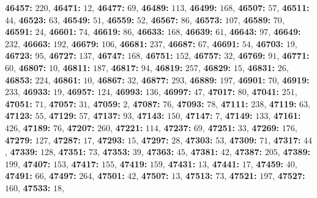 \textsf{\bfseries 46457:} $220$, \textsf{\bfseries 46471:} $12$, \textsf{\bfseries 46477:} $69$, \textsf{\bfseries 46489:} $113$, \textsf{\bfseries 46499:} $168$, \textsf{\bfseries 46507:} $57$, \textsf{\bfseries 46511:} $44$, \textsf{\bfseries 46523:} $63$, \textsf{\bfseries 46549:} $51$, \textsf{\bfseries 46559:} $52$, \textsf{\bfseries 46567:} $86$, \textsf{\bfseries 46573:} $107$, \textsf{\bfseries 46589:} $70$, \textsf{\bfseries 46591:} $24$, \textsf{\bfseries 46601:} $74$, \textsf{\bfseries 46619:} $86$, \textsf{\bfseries 46633:} $168$, \textsf{\bfseries 46639:} $61$, \textsf{\bfseries 46643:} $97$, \textsf{\bfseries 46649:} $232$, \textsf{\bfseries 46663:} $192$, \textsf{\bfseries 46679:} $106$, \textsf{\bfseries 46681:} $237$, \textsf{\bfseries 46687:} $67$, \textsf{\bfseries 46691:} $54$, \textsf{\bfseries 46703:} $19$, \textsf{\bfseries 46723:} $95$, \textsf{\bfseries 46727:} $137$, \textsf{\bfseries 46747:} $168$, \textsf{\bfseries 46751:} $152$, \textsf{\bfseries 46757:} $32$, \textsf{\bfseries 46769:} $91$, \textsf{\bfseries 46771:} $60$, \textsf{\bfseries 46807:} $10$, \textsf{\bfseries 46811:} $187$, \textsf{\bfseries 46817:} $94$, \textsf{\bfseries 46819:} $257$, \textsf{\bfseries 46829:} $15$, \textsf{\bfseries 46831:} $26$, \textsf{\bfseries 46853:} $224$, \textsf{\bfseries 46861:} $10$, \textsf{\bfseries 46867:} $32$, \textsf{\bfseries 46877:} $293$, \textsf{\bfseries 46889:} $197$, \textsf{\bfseries 46901:} $70$, \textsf{\bfseries 46919:} $233$, \textsf{\bfseries 46933:} $19$, \textsf{\bfseries 46957:} $124$, \textsf{\bfseries 46993:} $136$, \textsf{\bfseries 46997:} $47$, \textsf{\bfseries 47017:} $80$, \textsf{\bfseries 47041:} $251$, \textsf{\bfseries 47051:} $71$, \textsf{\bfseries 47057:} $31$, \textsf{\bfseries 47059:} $2$, \textsf{\bfseries 47087:} $76$, \textsf{\bfseries 47093:} $78$, \textsf{\bfseries 47111:} $238$, \textsf{\bfseries 47119:} $63$, \textsf{\bfseries 47123:} $55$, \textsf{\bfseries 47129:} $57$, \textsf{\bfseries 47137:} $93$, \textsf{\bfseries 47143:} $150$, \textsf{\bfseries 47147:} $7$, \textsf{\bfseries 47149:} $133$, \textsf{\bfseries 47161:} $426$, \textsf{\bfseries 47189:} $76$, \textsf{\bfseries 47207:} $260$, \textsf{\bfseries 47221:} $114$, \textsf{\bfseries 47237:} $69$, \textsf{\bfseries 47251:} $33$, \textsf{\bfseries 47269:} $176$, \textsf{\bfseries 47279:} $127$, \textsf{\bfseries 47287:} $17$, \textsf{\bfseries 47293:} $15$, \textsf{\bfseries 47297:} $28$, \textsf{\bfseries 47303:} $53$, \textsf{\bfseries 47309:} $71$, \textsf{\bfseries 47317:} $44$, \textsf{\bfseries 47339:} $128$, \textsf{\bfseries 47351:} $73$, \textsf{\bfseries 47353:} $39$, \textsf{\bfseries 47363:} $45$, \textsf{\bfseries 47381:} $42$, \textsf{\bfseries 47387:} $205$, \textsf{\bfseries 47389:} $199$, \textsf{\bfseries 47407:} $153$, \textsf{\bfseries 47417:} $155$, \textsf{\bfseries 47419:} $159$, \textsf{\bfseries 47431:} $13$, \textsf{\bfseries 47441:} $17$, \textsf{\bfseries 47459:} $40$, \textsf{\bfseries 47491:} $66$, \textsf{\bfseries 47497:} $264$, \textsf{\bfseries 47501:} $42$, \textsf{\bfseries 47507:} $13$, \textsf{\bfseries 47513:} $73$, \textsf{\bfseries 47521:} $197$, \textsf{\bfseries 47527:} $160$, \textsf{\bfseries 47533:} $18$, 
